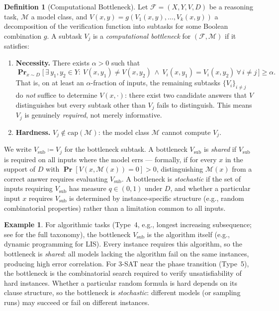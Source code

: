 \documentclass{article}
\theoremstyle{definition}
\newtheorem{definition}[theorem]{Definition}
\newtheorem{example}[theorem]{Example}
\theoremstyle{remark}
\newcommand{\calM}{\mathcal{M}}         %
\newcommand{\calF}{\mathcal{F}}         %
\renewcommand{\Pr}{\operatorname{\mathbf{Pr}}}
\begin{document}
\begin{definition}[Computational Bottleneck]
\label{def:bottleneck}
Let $\calF = (X, Y, V, D)$ be a reasoning task, $\calM$ a model class, and $V(x,y) = g(V_1(x,y), \ldots, V_k(x,y))$ a decomposition of the verification function into subtasks for some Boolean combination $g$.
A subtask $V_j$ is a \emph{computational bottleneck} for $(\calF, \calM)$ if it satisfies:
\begin{enumerate}[label=(B\arabic*)]
    \item \textbf{Necessity.} There exists $\alpha > 0$ such that
    \[
    \Pr_{x \sim D}\!\bigl[\,\exists\, y_1, y_2 \in Y :\ V(x,y_1) \neq V(x,y_2)\ \land\ V_i(x,y_1) = V_i(x,y_2)\ \forall\, i \neq j\,\bigr] \geq \alpha.
    \]
    That is, on at least an $\alpha$-fraction of inputs, the remaining subtasks $\{V_i\}_{i \neq j}$ do \emph{not} suffice to determine $V(x,\cdot)$: there exist two candidate answers that $V$ distinguishes but every subtask other than $V_j$ fails to distinguish.
    This means $V_j$ is genuinely \emph{required}, not merely informative.
    \item \textbf{Hardness.} $V_j \notin \mathrm{cap}(\calM)$: the model class $\calM$ cannot compute $V_j$.
\end{enumerate}
We write $V_{\mathrm{sub}} \coloneqq V_j$ for the bottleneck subtask.
A bottleneck $V_{\mathrm{sub}}$ is \emph{shared} if $V_{\mathrm{sub}}$ is required on all inputs where the model errs --- formally, if for every $x$ in the support of $D$ with $\Pr[V(x, \calM(x)) = 0] > 0$, distinguishing $\calM(x)$ from a correct answer requires evaluating $V_{\mathrm{sub}}$.
A bottleneck is \emph{stochastic} if the set of inputs requiring $V_{\mathrm{sub}}$ has measure $q \in (0,1)$ under $D$, and whether a particular input $x$ requires $V_{\mathrm{sub}}$ is determined by instance-specific structure (e.g., random combinatorial properties) rather than a limitation common to all inputs.
\end{definition}

\begin{example}
For algorithmic tasks (Type~4, e.g., longest increasing subsequence; see  for the full taxonomy), the bottleneck $V_{\mathrm{sub}}$ is the algorithm itself (e.g., dynamic programming for LIS). Every instance requires this algorithm, so the bottleneck is \emph{shared}: all models lacking the algorithm fail on the same instances, producing high error correlation.
For 3-SAT near the phase transition (Type~5), the bottleneck is the combinatorial search required to verify unsatisfiability of hard instances.
Whether a particular random formula is hard depends on its clause structure, so the bottleneck is \emph{stochastic}: different models (or sampling runs) may succeed or fail on different instances.
\end{example}
\end{document}
